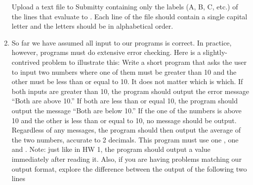 \documentclass[letterpaper,10pt,english]{sphinxmanual}
\begin{document}
\begin{enumerate}
%
\begin{sphinxVerbatim}[commandchars=\\\{\}]
  
  
  
              
               
         
          
            
            
\end{sphinxVerbatim}

Upload a text file to Submitty containing only the labels (A, B, C,
etc.) of the lines that evaluate to .  Each line of the
file should contain a single capital letter and the letters should
be in alphabetical order.

\item {} 
So far we have assumed all input to our programs is correct.  In
practice, however, programs must do extensive error checking.  Here
is a slightly-contrived problem to illustrate this: Write a short
program that asks the user to input two numbers where one of them
must be greater than 10 and the other must be less than or equal
to 10.  It does not matter which is which.  If both inputs are
greater than 10, the program should output the error message “Both
are above 10.”  If both are less than or equal 10, the program
should output the message “Both are below 10.”  If the one of the
numbers is above 10 and the other is less than or equal to 10, no message
should be output.  Regardless of any messages, the program should then
output the average of
the two numbers, accurate to 2 decimals.  This program must use one
, one  and  .  Note: just like in HW 1, the
program should output a value immediately after reading it. Also, if you
are having problems matching our output format, explore the difference
between the output of the following two lines


\end{enumerate}
\end{document}
